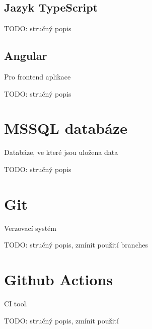 \subsection{Jazyk TypeScript}
TODO: stručný popis

\subsection{Angular}
Pro frontend aplikace

TODO: stručný popis

\section{MSSQL databáze}
Databáze, ve které jsou uložena data

TODO: stručný popis

\section{Git}
Verzovací systém

TODO: stručný popis, zmínit použití branches

\section{Github Actions}
CI tool.

TODO: stručný popis, zmínit použití